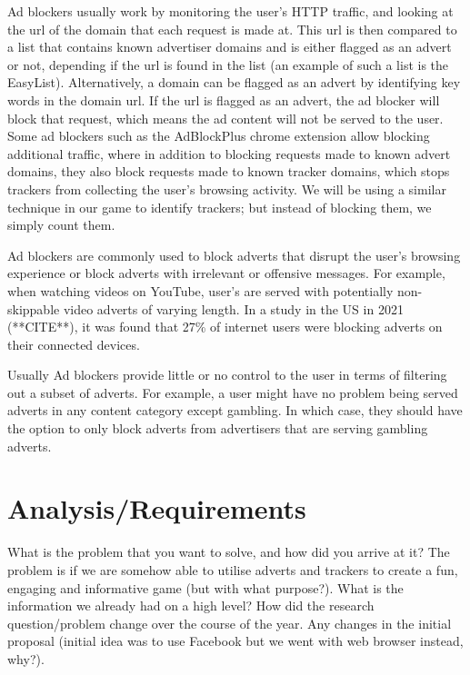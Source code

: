 \documentclass{l4proj}
\begin{document}
Ad blockers usually work by monitoring the user's HTTP traffic, and looking at the url of the domain that each request is made at. This url is then compared to a list that contains known advertiser domains and is either flagged as an advert or not, depending if the url is found in the list (an example of such a list is the EasyList). Alternatively, a domain can be flagged as an advert by identifying key words in the domain url. If the url is flagged as an advert, the ad blocker will block that request, which means the ad content will not be served to the user. Some ad blockers such as the AdBlockPlus chrome extension allow blocking additional traffic, where in addition to blocking requests made to known advert domains, they also block requests made to known tracker domains, which stops trackers from collecting the user's browsing activity. We will be using a similar technique in our game to identify trackers; but instead of blocking them, we simply count them.

Ad blockers are commonly used to block adverts that disrupt the user's browsing experience or block adverts with irrelevant or offensive messages. For example, when watching videos on YouTube, user's are served with potentially non-skippable video adverts of varying length. In a study in the US in 2021 (**CITE**), it was found that 27\% of internet users were blocking adverts on their connected devices. 

Usually Ad blockers provide little or no control to the user in terms of filtering out a subset of adverts. For example, a user might have no problem being served adverts in any content category except gambling. In which case, they should have the option to only block adverts from advertisers that are serving gambling adverts. 

\chapter{Analysis/Requirements}
What is the problem that you want to solve, and how did you arrive at it?
The problem is if we are somehow able to utilise adverts and trackers to create a fun, engaging and informative game (but with what purpose?). What is the information we already had on a high level? How did the research question/problem change over the course of the year. Any changes in the initial proposal (initial idea was to use Facebook but we went with web browser instead, why?).
\end{document}
